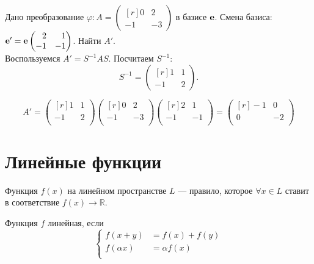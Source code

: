 \begin{prim} 
	Дано преобразование $\varphi\colon A = \begin{pmatrix*}[r] 0 & 2 \\ -1 & -3 \end{pmatrix*}$ в базисе $\bf e$. Смена базиса: $\bf e' = \bf e \begin{pmatrix*}[r] 2 & 1 \\ -1 & -1 \end{pmatrix*}$.
	Найти $A'$.\\
	
	Воспользуемся $A'=S^{-1}AS$. Посчитаем $S^{-1}$:\\
	$$S^{-1} =
	\begin{pmatrix*}[r] 1 & 1 \\ -1 & 2 \end{pmatrix*}.$$
\end{prim}
$$
A'=
\begin{pmatrix*}[r]
1 & 1\\
-1 & 2\\
\end{pmatrix*}
\begin{pmatrix*}[r]
0 & 2\\
-1 & -3\\
\end{pmatrix*}
\begin{pmatrix*}[r]
2 & 1\\
-1 & -1\\
\end{pmatrix*}
=
\begin{pmatrix*}[r]
-1 & 0\\
0 & -2\\
\end{pmatrix*}
$$
\section{Линейные функции}
\begin{definition}
	\textsf{Функция} $f(x)$ на линейном пространстве $L$ --- правило, которое $\forall x \in L$ ставит в соответствие $f(x) \rightarrow \mathbb{R} $.
	
	Функция $f$ линейная, если 
	$$
	\left\{
	\begin{array}{rl} %
	f(x+y)&=f(x)+f(y)\\
	f(\alpha x)&=\alpha f(x)\\
	\end{array}
	\right.
	$$
\end{definition}


